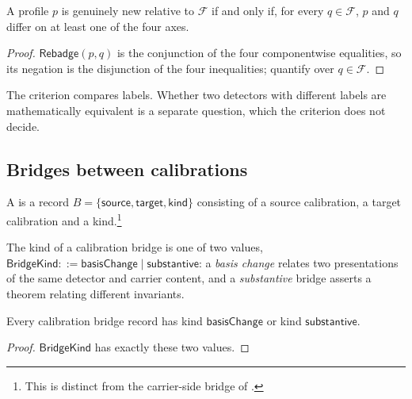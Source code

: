 \begin{theorem}\label{thm:rebadge-discipline}
A profile \(p\) is genuinely new relative to \(\mathcal F\) if and only
if, for every \(q\in\mathcal F\), \(p\) and \(q\) differ on at least one
of the four axes.
\end{theorem}

\begin{proof}
\(\mathsf{Rebadge}(p,q)\) is the conjunction of the four componentwise
equalities, so its negation is the disjunction of the four
inequalities; quantify over \(q\in\mathcal F\).
\end{proof}

The criterion compares labels.  Whether two detectors with different
labels are mathematically equivalent is a separate question, which the
criterion does not decide.

\subsection{Bridges between calibrations}\label{sec:calibration:bridges-as-theorems}

\begin{definition}\label{def:calibration-side-typed-bridge}
A \emph{\TypedBridgeCalibration} is a record
\(B=\{\mathsf{source},\mathsf{target},\mathsf{kind}\}\) consisting of a
source calibration, a target calibration and a kind.\footnote{This is
distinct from the carrier-side bridge of
.}
\end{definition}

\begin{definition}\label{def:bridge-kind}
The kind of a calibration bridge is one of two values,
\(\mathsf{BridgeKind}::=\mathsf{basisChange}\mid\mathsf{substantive}\):
a \emph{basis change} relates two presentations of the same detector and
carrier content, and a \emph{substantive} bridge asserts a theorem
relating different invariants.
\end{definition}

\begin{theorem}\label{thm:bridges-as-theorems}
Every calibration bridge record has kind \(\mathsf{basisChange}\) or
kind \(\mathsf{substantive}\).
\end{theorem}

\begin{proof}
\(\mathsf{BridgeKind}\) has exactly these two values.
\end{proof}

